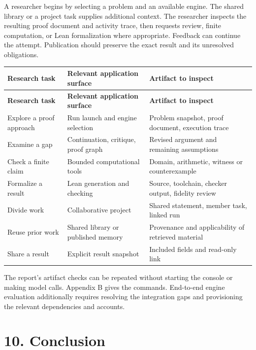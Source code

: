 \documentclass[11pt,a4paper]{article}
\begin{document}
A researcher begins by selecting a problem and an available engine. The shared library or a project task supplies additional context. The researcher inspects the resulting proof document and activity trace, then requests review, finite computation, or Lean formalization where appropriate. Feedback can continue the attempt. Publication should preserve the exact result and its unresolved obligations.

\begingroup\small
\setlength{\tabcolsep}{4pt}
\begin{longtable}{>{\raggedright\arraybackslash}p{0.23\dimexpr\linewidth-6\tabcolsep\relax}>{\raggedright\arraybackslash}p{0.38\dimexpr\linewidth-6\tabcolsep\relax}>{\raggedright\arraybackslash}p{0.39\dimexpr\linewidth-6\tabcolsep\relax}}
\toprule
\textbf{Research task} & \textbf{Relevant application surface} & \textbf{Artifact to inspect} \\
\midrule\endfirsthead
\toprule
\textbf{Research task} & \textbf{Relevant application surface} & \textbf{Artifact to inspect} \\
\midrule\endhead
\bottomrule\endfoot
Explore a proof approach & Run launch and engine selection & Problem snapshot, proof document, execution trace \\
Examine a gap & Continuation, critique, proof graph & Revised argument and remaining assumptions \\
Check a finite claim & Bounded computational tools & Domain, arithmetic, witness or counterexample \\
Formalize a result & Lean generation and checking & Source, toolchain, checker output, fidelity review \\
Divide work & Collaborative project & Shared statement, member task, linked run \\
Reuse prior work & Shared library or published memory & Provenance and applicability of retrieved material \\
Share a result & Explicit result snapshot & Included fields and read-only link \\
\end{longtable}
\endgroup

The report's artifact checks can be repeated without starting the console or making model calls. Appendix B gives the commands. End-to-end engine evaluation additionally requires resolving the integration gaps and provisioning the relevant dependencies and accounts.

\section*{10. Conclusion}
\end{document}
